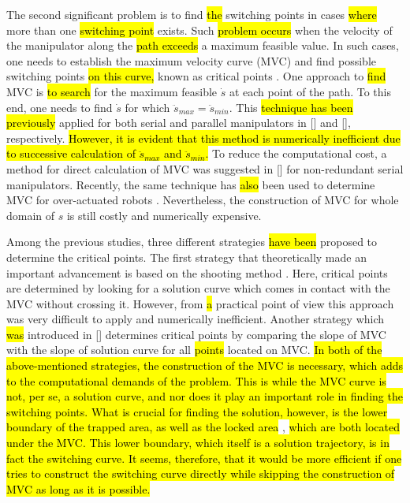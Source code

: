 \documentclass{rob}%
\begin{document}
The second significant problem is to find \hl{the} switching points in cases \hl{where} more than one \hl{switching point} exists. Such \hl{problem occurs} when the velocity of the manipulator along the \hl{path exceeds} a maximum feasible value. In such cases, one needs to establish the maximum velocity curve (MVC) and find possible switching points \hl{on this curve,} known as critical points \cite{Pfeiffer1987}. 
One approach to \hl{find} MVC is \hl{to search} for the maximum feasible $ \dot s $ at each point of the path. To this end, one needs to find $ \dot s $ for which $ \ddot s_{max} = \ddot s_{min} $. This \hl{technique has been previously} applied for both serial and parallel manipulators in [] and [], respectively. \hl{However, it is evident that this method is numerically inefficient due to successive calculation of $ \ddot s_{max} $ and $ \ddot s_{min} $.} %
To reduce the computational cost, a method for direct calculation of MVC was suggested in [] for non-redundant serial manipulators.
Recently, the same technique has \hl{also} been used to determine MVC for over-actuated robots \cite{Pham2015}. Nevertheless, the construction of MVC for whole domain of $ s $ is still costly and numerically expensive.
	
Among the previous studies, three different strategies \hl{have been} proposed to determine the critical points. The first strategy that theoretically made an important advancement is based on the shooting method \cite{Bobrow1985}. Here, critical points are determined by looking for a solution curve which comes in contact with the MVC without crossing it. However, from \hl{a} practical point of view this approach was very difficult to apply and numerically inefficient. Another strategy which \hl{was} introduced in [] determines critical points by comparing the slope of MVC with the slope of solution curve for all \hl{points} located on MVC.
\hl{In both of the above-mentioned strategies, the construction of the MVC is necessary, which adds to the computational demands of the problem. This is while the MVC curve is not, per se, a solution curve, and nor does it play an important role in finding the switching points. What is crucial for finding the solution, however, is the lower boundary of the trapped area, as well as the locked area} \cite{Zlajpah1996}, \hl{which are both located under the MVC. This lower boundary, which itself is a solution trajectory, is in fact the switching curve. It seems, therefore, that it would be more efficient if one tries to construct the switching curve directly while skipping the construction of MVC as long as it is possible.}
	
\end{document}
